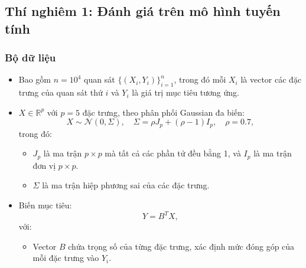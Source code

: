 \documentclass[12pt, a4paper]{article}
\theoremstyle{plain}
\theoremstyle{proposition}
\theoremstyle{lemma}
\begin{document}
\subsection{Thí nghiêm 1: Đánh giá trên mô hình tuyến tính}
\subsubsection{Bộ dữ liệu}
        \begin{itemize}[align=parleft, left=4em, labelsep=1em, itemsep=0.5em]
                    \item Bao gồm $n = 10^4$ quan sát $\{(X_i, Y_i)\}_{i=1}^{n}$, trong đó mỗi $X_i$ là vector các đặc trưng của quan sát thứ $i$ và $Y_i$ là giá trị mục tiêu tương ứng.
                    
                    \item $X \in \mathbb{R}^p$ với $p = 5$ đặc trưng, theo phân phối Gaussian đa biến: 
                    \begin{equation*}
                        X \sim \mathcal{N}(0, \Sigma), \quad 
                        \Sigma = \rho J_p + (\rho - 1) I_p, \quad 
                        \rho = 0.7,
                    \end{equation*}
                    trong đó:
                      \begin{itemize}[label=$\circ$, left=1em, labelsep=0.75em, itemsep=0.5em]
                            \item $J_p$ là ma trận $p \times p$ mà tất cả các phần tử đều bằng 1, và $I_p$ là ma trận đơn vị $p \times p$.
        
                            \item $\Sigma$ là ma trận hiệp phương sai của các đặc trưng.
                        
                        \end{itemize}
                
                    \item Biến mục tiêu:
                    \begin{equation*}
                        Y = B^T X,
                    \end{equation*}
                    với:
                    
                      \begin{itemize}[label=$\circ$, left=1em, labelsep=0.75em, itemsep=0.5em]
                        \item Vector $B$ chứa trọng số của từng đặc trưng, xác định mức đóng góp của mỗi đặc trưng vào $Y_i$.
                     \end{itemize} 
        \end{itemize}
\end{document}
